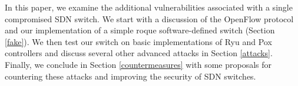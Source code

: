 In this paper, we examine the additional vulnerabilities associated with a single compromised SDN switch. We start with a discussion of the OpenFlow protocol and our implementation of a simple roque software-defined switch (Section \ref{fake}).  We then test our switch on basic implementations of Ryu and Pox controllers and discuss several other advanced attacks in Section \ref{attacks}. Finally, we conclude in Section \ref{countermeasures} with some proposals for countering these attacks and improving the security of SDN switches.




